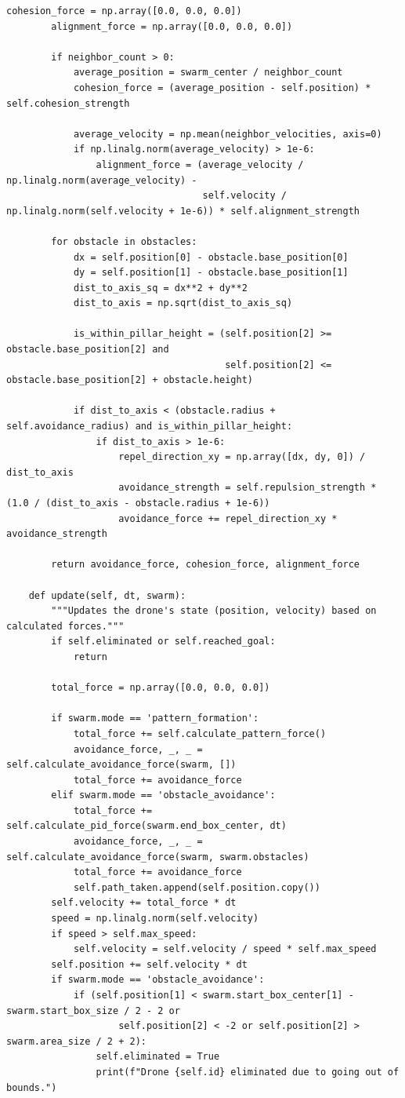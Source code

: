 \documentclass[11pt]{article}
\begin{document}
\begin{lstlisting}[style=pythonstyle]
        cohesion_force = np.array([0.0, 0.0, 0.0])
        alignment_force = np.array([0.0, 0.0, 0.0])

        if neighbor_count > 0:
            average_position = swarm_center / neighbor_count
            cohesion_force = (average_position - self.position) * self.cohesion_strength

            average_velocity = np.mean(neighbor_velocities, axis=0)
            if np.linalg.norm(average_velocity) > 1e-6:
                alignment_force = (average_velocity / np.linalg.norm(average_velocity) -
                                   self.velocity / np.linalg.norm(self.velocity + 1e-6)) * self.alignment_strength

        for obstacle in obstacles:
            dx = self.position[0] - obstacle.base_position[0]
            dy = self.position[1] - obstacle.base_position[1]
            dist_to_axis_sq = dx**2 + dy**2
            dist_to_axis = np.sqrt(dist_to_axis_sq)

            is_within_pillar_height = (self.position[2] >= obstacle.base_position[2] and
                                       self.position[2] <= obstacle.base_position[2] + obstacle.height)

            if dist_to_axis < (obstacle.radius + self.avoidance_radius) and is_within_pillar_height:
                if dist_to_axis > 1e-6:
                    repel_direction_xy = np.array([dx, dy, 0]) / dist_to_axis
                    avoidance_strength = self.repulsion_strength * (1.0 / (dist_to_axis - obstacle.radius + 1e-6))
                    avoidance_force += repel_direction_xy * avoidance_strength

        return avoidance_force, cohesion_force, alignment_force

    def update(self, dt, swarm):
        """Updates the drone's state (position, velocity) based on calculated forces."""
        if self.eliminated or self.reached_goal:
            return

        total_force = np.array([0.0, 0.0, 0.0])

        if swarm.mode == 'pattern_formation':
            total_force += self.calculate_pattern_force()
            avoidance_force, _, _ = self.calculate_avoidance_force(swarm, [])
            total_force += avoidance_force
        elif swarm.mode == 'obstacle_avoidance':
            total_force += self.calculate_pid_force(swarm.end_box_center, dt)
            avoidance_force, _, _ = self.calculate_avoidance_force(swarm, swarm.obstacles)
            total_force += avoidance_force
            self.path_taken.append(self.position.copy())
        self.velocity += total_force * dt
        speed = np.linalg.norm(self.velocity)
        if speed > self.max_speed:
            self.velocity = self.velocity / speed * self.max_speed
        self.position += self.velocity * dt
        if swarm.mode == 'obstacle_avoidance':
            if (self.position[1] < swarm.start_box_center[1] - swarm.start_box_size / 2 - 2 or
                    self.position[2] < -2 or self.position[2] > swarm.area_size / 2 + 2):
                self.eliminated = True
                print(f"Drone {self.id} eliminated due to going out of bounds.")


\end{lstlisting}
\end{document}
